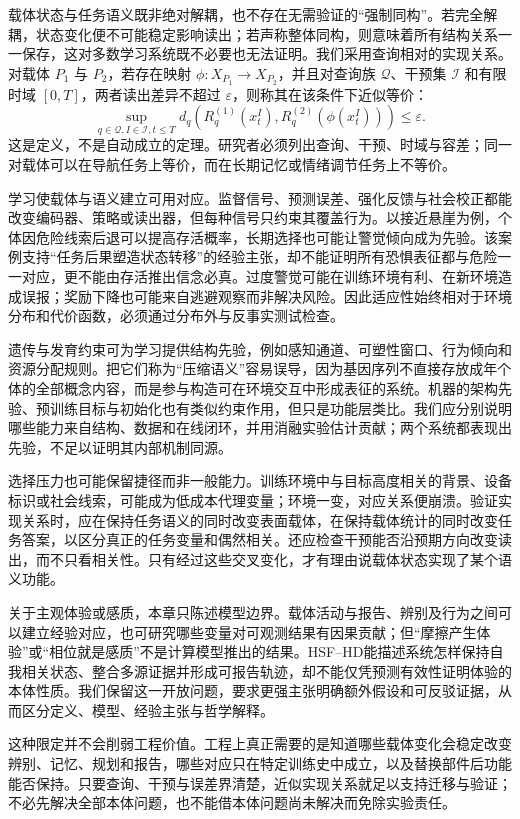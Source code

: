 载体状态与任务语义既非绝对解耦，也不存在无需验证的“强制同构”。若完全解耦，状态变化便不可能稳定影响读出；若声称整体同构，则意味着所有结构关系一一保存，这对多数学习系统既不必要也无法证明。我们采用查询相对的实现关系。对载体 $P_1$ 与 $P_2$，若存在映射 $\phi:X_{P_1}\to X_{P_2}$，并且对查询族 $\mathcal Q$、干预集 $\mathcal I$ 和有限时域 $[0,T]$，两者读出差异不超过 $\varepsilon$，则称其在该条件下近似等价：
\[
\sup_{q\in\mathcal Q,I\in\mathcal I,t\le T}
d_q(R_q^{(1)}(x_t^I),R_q^{(2)}(\phi(x_t^I)))\le\varepsilon.
\]
这是定义，不是自动成立的定理。研究者必须列出查询、干预、时域与容差；同一对载体可以在导航任务上等价，而在长期记忆或情绪调节任务上不等价。

学习使载体与语义建立可用对应。监督信号、预测误差、强化反馈与社会校正都能改变编码器、策略或读出器，但每种信号只约束其覆盖行为。以接近悬崖为例，个体因危险线索后退可以提高存活概率，长期选择也可能让警觉倾向成为先验。该案例支持“任务后果塑造状态转移”的经验主张，却不能证明所有恐惧表征都与危险一一对应，更不能由存活推出信念必真。过度警觉可能在训练环境有利、在新环境造成误报；奖励下降也可能来自逃避观察而非解决风险。因此适应性始终相对于环境分布和代价函数，必须通过分布外与反事实测试检查。

遗传与发育约束可为学习提供结构先验，例如感知通道、可塑性窗口、行为倾向和资源分配规则。把它们称为“压缩语义”容易误导，因为基因序列不直接存放成年个体的全部概念内容，而是参与构造可在环境交互中形成表征的系统。机器的架构先验、预训练目标与初始化也有类似约束作用，但只是功能层类比。我们应分别说明哪些能力来自结构、数据和在线闭环，并用消融实验估计贡献；两个系统都表现出先验，不足以证明其内部机制同源。

选择压力也可能保留捷径而非一般能力。训练环境中与目标高度相关的背景、设备标识或社会线索，可能成为低成本代理变量；环境一变，对应关系便崩溃。验证实现关系时，应在保持任务语义的同时改变表面载体，在保持载体统计的同时改变任务答案，以区分真正的任务变量和偶然相关。还应检查干预能否沿预期方向改变读出，而不只看相关性。只有经过这些交叉变化，才有理由说载体状态实现了某个语义功能。

关于主观体验或感质，本章只陈述模型边界。载体活动与报告、辨别及行为之间可以建立经验对应，也可研究哪些变量对可观测结果有因果贡献；但“摩擦产生体验”或“相位就是感质”不是计算模型推出的结果。HSF--HD能描述系统怎样保持自我相关状态、整合多源证据并形成可报告轨迹，却不能仅凭预测有效性证明体验的本体性质。我们保留这一开放问题，要求更强主张明确额外假设和可反驳证据，从而区分定义、模型、经验主张与哲学解释。

这种限定并不会削弱工程价值。工程上真正需要的是知道哪些载体变化会稳定改变辨别、记忆、规划和报告，哪些对应只在特定训练史中成立，以及替换部件后功能能否保持。只要查询、干预与误差界清楚，近似实现关系就足以支持迁移与验证；不必先解决全部本体问题，也不能借本体问题尚未解决而免除实验责任。

